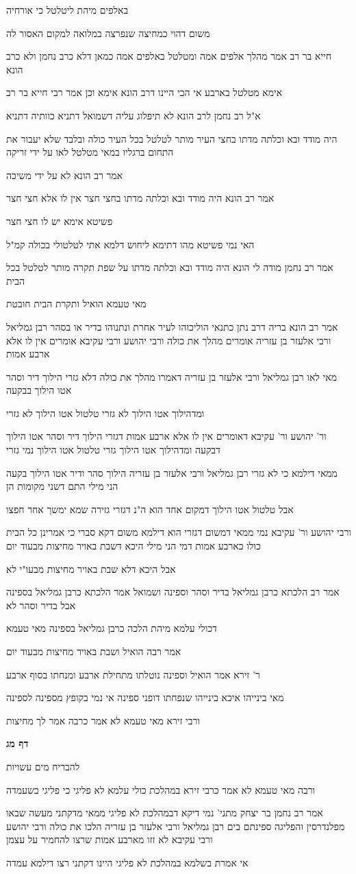 \documentclass[12pt, openany]{book}
\newcommand{\sethebfont}{
\fontsize{10.5pt}{21.0pt} \selectfont
}
\newcommand{\textblock}[1]{
{\sethebfont #1\\}	
}
\newcommand{\sectname}{}
\newcommand{\newsection}[1]{
	\addcontentsline{toc}{section}{#1}
	\renewcommand{\sectname}{#1}	
	\vspace{-\baselineskip}
	\begin{center}
		\textbf{%
\fontsize{16pt}{16pt}\selectfont
			#1}
	\end{center}
	\vspace{-\baselineskip}
	\nopagebreak
}
\begin{document}
\textblock{באלפים מיהת ליטלטל כי אורחיה}
\textblock{משום דהוי כמחיצה שנפרצה במלואה למקום האסור לה}
\textblock{חייא בר רב אמר מהלך אלפים אמה ומטלטל באלפים אמה כמאן דלא כרב נחמן ולא כרב הונא}
\textblock{אימא מטלטל בארבע אי הכי היינו דרב הונא אימא וכן אמר רבי חייא בר רב}
\textblock{א"ל רב נחמן לרב הונא לא תיפלוג עליה דשמואל דתניא כוותיה דתניא}
\textblock{היה מודד ובא וכלתה מדתו בחצי העיר מותר לטלטל בכל העיר כולה ובלבד שלא יעבור את התחום ברגליו במאי מטלטל לאו על ידי זריקה}
\textblock{אמר רב הונא לא על ידי משיכה}
\textblock{אמר רב הונא היה מודד ובא וכלתה מדתו בחצי חצר אין לו אלא חצי חצר}
\textblock{פשיטא אימא יש לו חצי חצר}
\textblock{האי נמי פשיטא מהו דתימא ליחוש דלמא אתי לטלטולי בכולה קמ"ל}
\textblock{אמר רב נחמן מודה לי הונא היה מודד ובא וכלתה מדתו על שפת תקרה מותר לטלטל בכל הבית}
\textblock{מאי טעמא הואיל ותקרת הבית חובטת}
\textblock{אמר רב הונא בריה דרב נתן כתנאי הוליכוהו לעיר אחרת ונתנוהו בדיר או בסהר רבן גמליאל ורבי אלעזר בן עזריה אומרים מהלך את כולה ורבי יהושע ורבי עקיבא אומרים אין לו אלא ארבע אמות}
\textblock{מאי לאו רבן גמליאל ורבי אלעזר בן עזריה דאמרו מהלך את כולה דלא גזרי הילוך דיר וסהר אטו הילוך בבקעה}
\textblock{ומדהילוך אטו הילוך לא גזרי טלטול אטו הילוך לא גזרי}
\textblock{ור' יהושע ור' עקיבא דאומרים אין לו אלא ארבע אמות דגזרי הילוך דיר וסהר אטו הילוך דבקעה ומדהילוך אטו הילוך גזרי טלטול אטו הילוך נמי גזרי}
\textblock{ממאי דילמא כי לא גזרי רבן גמליאל ורבי אלעזר בן עזריה הילוך סהר ודיר אטו הילוך בקעה הני מילי התם דשני מקומות הן}
\textblock{אבל טלטול אטו הילוך דמקום אחד הוא ה"נ דגזרי גזירה שמא ימשך אחר חפצו}
\textblock{ורבי יהושע ור' עקיבא נמי ממאי דמשום דגזרי הוא דילמא משום דקא סברי כי אמרינן כל הבית כולו כארבע אמות דמי הני מילי היכא דשבת באויר מחיצות מבעוד יום}
\textblock{אבל היכא דלא שבת באויר מחיצות מבעו"י לא}
\textblock{אמר רב הלכתא כרבן גמליאל בדיר וסהר וספינה ושמואל אמר הלכתא כרבן גמליאל בספינה אבל בדיר וסהר לא}
\textblock{דכולי עלמא מיהת הלכה כרבן גמליאל בספינה מאי טעמא}
\textblock{אמר רבה הואיל ושבת באויר מחיצות מבעוד יום}
\textblock{ר' זירא אמר הואיל וספינה נוטלתו מתחילת ארבע ומנחתו בסוף ארבע}
\textblock{מאי בינייהו איכא בינייהו שנפחתו דופני ספינה אי נמי בקופץ מספינה לספינה}
\textblock{ורבי זירא מאי טעמא לא אמר כרבה אמר לך מחיצות}
\newsection{דף מג}
\textblock{להבריח מים עשויות}
\textblock{ורבה מאי טעמא לא אמר כרבי זירא במהלכת כולי עלמא לא פליגי כי פליגי בשעמדה}
\textblock{אמר רב נחמן בר יצחק מתני' נמי דיקא דבמהלכת לא פליגי ממאי מדקתני מעשה שבאו מפלנדרסין והפליגה ספינתם בים רבן גמליאל ורבי אלעזר בן עזריה הלכו את כולה ורבי יהושע ורבי עקיבא לא זזו מארבע אמות שרצו להחמיר על עצמן}
\textblock{אי אמרת בשלמא במהלכת לא פליגי היינו דקתני רצו דילמא עמדה}
\end{document}
